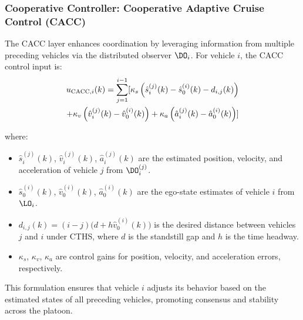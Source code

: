\subsubsection{Cooperative Controller: Cooperative Adaptive Cruise Control (CACC)}
The CACC layer enhances coordination by leveraging information from multiple preceding vehicles via the distributed observer $\DO_i$. For vehicle $i$, the CACC control input is:
\begin{align}
    u_{\text{CACC},i}(k) = \sum_{j=1}^{i-1} [ \kappa_s \left( \hat{s}_i^{(j)}(k) - \hat{s}_0^{(i)}(k) - d_{i,j}(k) \right) \\ \notag +  \kappa_v \left( \hat{v}_i^{(j)}(k) -  \hat{v}_0^{(i)}(k) \right) + \kappa_a \left( \hat{a}_i^{(j)}(k) - \hat{a}_0^{(i)}(k) \right)]
\end{align}

where:
\begin{itemize}
    \item $\hat{s}_i^{(j)}(k)$, $\hat{v}_i^{(j)}(k)$, $\hat{a}_i^{(j)}(k)$ are the estimated position, velocity, and acceleration of vehicle $j$ from $\DO_i^{(j)}$.
    \item $\hat{s}_0^{(i)}(k)$, $\hat{v}_0^{(i)}(k)$, $\hat{a}_0^{(i)}(k)$ are the ego-state estimates of vehicle $i$ from $\LO_i$.
    \item $d_{i,j}(k) = (i-j)\big(d + h \hat{v}_0^{(i)}(k)\big)$ is the desired distance between vehicles $j$ and $i$ under CTHS, where $d$ is the standstill gap and $h$ is the time headway.
    \item $\kappa_s$, $\kappa_v$, $\kappa_a$ are control gains for position, velocity, and acceleration errors, respectively.
\end{itemize}
This formulation ensures that vehicle $i$ adjusts its behavior based on the estimated states of all preceding vehicles, promoting consensus and stability across the platoon.

